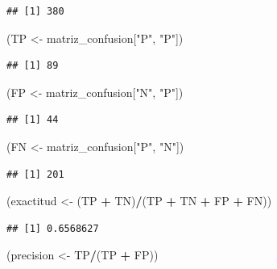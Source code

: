 \documentclass[
  12pt,
]{book}
\newenvironment{Shaded}{\begin{snugshade}}{\end{snugshade}}
\newcommand{\NormalTok}[1]{#1}
\newcommand{\OperatorTok}[1]{\textcolor[rgb]{0.81,0.36,0.00}{\textbf{#1}}}
\newcommand{\StringTok}[1]{\textcolor[rgb]{0.31,0.60,0.02}{#1}}
\theoremstyle{definition}
\theoremstyle{definition}
\theoremstyle{definition}
\theoremstyle{remark}
\begin{document}
\begin{verbatim}
## [1] 380
\end{verbatim}

\begin{Shaded}
\begin{Highlighting}[]
\NormalTok{(TP <-}\StringTok{ }\NormalTok{matriz_confusion[}\StringTok{"P"}\NormalTok{, }\StringTok{"P"}\NormalTok{])}
\end{Highlighting}
\end{Shaded}

\begin{verbatim}
## [1] 89
\end{verbatim}

\begin{Shaded}
\begin{Highlighting}[]
\NormalTok{(FP <-}\StringTok{ }\NormalTok{matriz_confusion[}\StringTok{"N"}\NormalTok{, }\StringTok{"P"}\NormalTok{])}
\end{Highlighting}
\end{Shaded}

\begin{verbatim}
## [1] 44
\end{verbatim}

\begin{Shaded}
\begin{Highlighting}[]
\NormalTok{(FN <-}\StringTok{ }\NormalTok{matriz_confusion[}\StringTok{"P"}\NormalTok{, }\StringTok{"N"}\NormalTok{])}
\end{Highlighting}
\end{Shaded}

\begin{verbatim}
## [1] 201
\end{verbatim}

\begin{Shaded}
\begin{Highlighting}[]
\NormalTok{(exactitud <-}\StringTok{ }\NormalTok{(TP }\OperatorTok{+}\StringTok{ }\NormalTok{TN)}\OperatorTok{/}\NormalTok{(TP }\OperatorTok{+}\StringTok{ }\NormalTok{TN }\OperatorTok{+}\StringTok{ }\NormalTok{FP }\OperatorTok{+}\StringTok{ }\NormalTok{FN))}
\end{Highlighting}
\end{Shaded}

\begin{verbatim}
## [1] 0.6568627
\end{verbatim}

\begin{Shaded}
\begin{Highlighting}[]
\NormalTok{(precision <-}\StringTok{ }\NormalTok{TP}\OperatorTok{/}\NormalTok{(TP }\OperatorTok{+}\StringTok{ }\NormalTok{FP))}
\end{Highlighting}
\end{Shaded}
\end{document}
